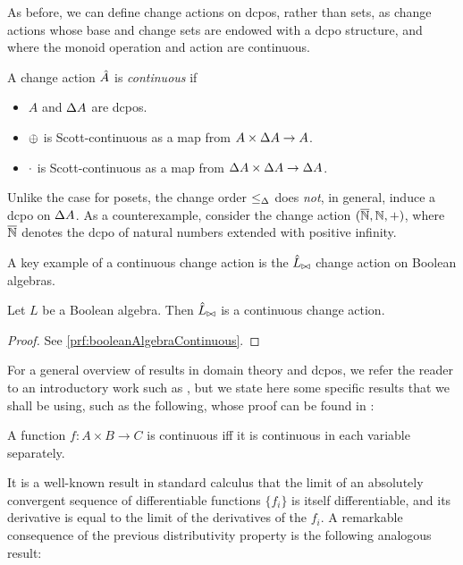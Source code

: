As before, we can define change actions on dcpos, rather than sets, as change
actions whose base and change sets are endowed with a dcpo structure, and where
the monoid operation and action are continuous.

\begin{defn}
  A change action $\hat{A}$ is \emph{continuous} if
  \begin{itemize}
    \item $A$ and $\Delta A$ are dcpos.
    \item $\oplus$ is Scott-continuous as a map from $A \times \Delta A \rightarrow A$.
    \item $\cdot$ is Scott-continuous as a map from $\Delta A \times \Delta A \rightarrow \Delta A$.
  \end{itemize}
\end{defn}

Unlike the case for posets, the change order $\leq_\Delta$ does \emph{not}, in general,
induce a dcpo on $\Delta A$. As a counterexample, consider 
the change action $(\overline{\mathbb{N}}, \mathbb{N}, +)$, where $\overline{\mathbb{N}}$ denotes the dcpo of natural numbers
extended with positive infinity.

A key example of a continuous change action is the $\hat{L}_{\bowtie}$ change
action on Boolean algebras.

\begin{prop}[name=Boolean algebra continuity, restate=booleanAlgebraContinuous]
  \label{prop:booleanAlgebraContinuous}
  Let $L$ be a Boolean algebra. Then $\hat{L}_{\bowtie}$ is a continuous
  change action.
\end{prop}
\ifproofs
\begin{proof}
  See \cref{prf:booleanAlgebraContinuous}.
\end{proof}
\fi

For a general overview of results in domain theory and dcpos, we refer the reader to an
introductory work such as \cite{abramsky1994domain}, but we state here some specific results that
we shall be using, such as the following, whose proof can be found in 
\cite[Lemma~3.2.6]{abramsky1994domain}:

\begin{prop}
  \label{prop:distributivityLimit}
  A function $f : A \times B \rightarrow C$ is continuous iff it is continuous in each variable
  separately.
\end{prop}

It is a well-known result in standard calculus that the limit of an absolutely convergent sequence of
differentiable functions $\{f_i\}$ is itself differentiable, and its derivative is equal to the limit
of the derivatives of the $f_i$. A remarkable consequence of the previous distributivity property
is the following analogous result:

